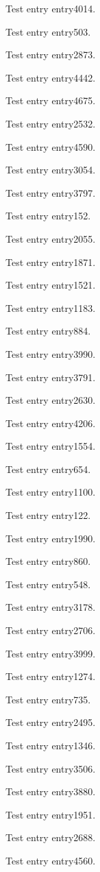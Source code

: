 Test entry \gls{entry4014}.

Test entry \gls{entry503}.

Test entry \gls{entry2873}.

Test entry \gls{entry4442}.

Test entry \gls{entry4675}.

Test entry \gls{entry2532}.

Test entry \gls{entry4590}.

Test entry \gls{entry3054}.

Test entry \gls{entry3797}.

Test entry \gls{entry152}.

Test entry \gls{entry2055}.

Test entry \gls{entry1871}.

Test entry \gls{entry1521}.

Test entry \gls{entry1183}.

Test entry \gls{entry884}.

Test entry \gls{entry3990}.

Test entry \gls{entry3791}.

Test entry \gls{entry2630}.

Test entry \gls{entry4206}.

Test entry \gls{entry1554}.

Test entry \gls{entry654}.

Test entry \gls{entry1100}.

Test entry \gls{entry122}.

Test entry \gls{entry1990}.

Test entry \gls{entry860}.

Test entry \gls{entry548}.

Test entry \gls{entry3178}.

Test entry \gls{entry2706}.

Test entry \gls{entry3999}.

Test entry \gls{entry1274}.

Test entry \gls{entry735}.

Test entry \gls{entry2495}.

Test entry \gls{entry1346}.

Test entry \gls{entry3506}.

Test entry \gls{entry3880}.

Test entry \gls{entry1951}.

Test entry \gls{entry2688}.

Test entry \gls{entry4560}.

